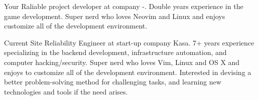 

\begin{cvparagraph}

	Your Raliable project developer at company -. Double years experience in the game development. Super nerd who loves Neovim and Linux and enjoys customize all of the development environment.

	Current Site Reliability Engineer at start-up company Kasa. 7+ years experience specializing in the backend development, infrastructure automation, and computer hacking/security. Super nerd who loves Vim, Linux and OS X and enjoys to customize all of the development environment. Interested in devising a better problem-solving method for challenging tasks, and learning new technologies and tools if the need arises.
\end{cvparagraph}
